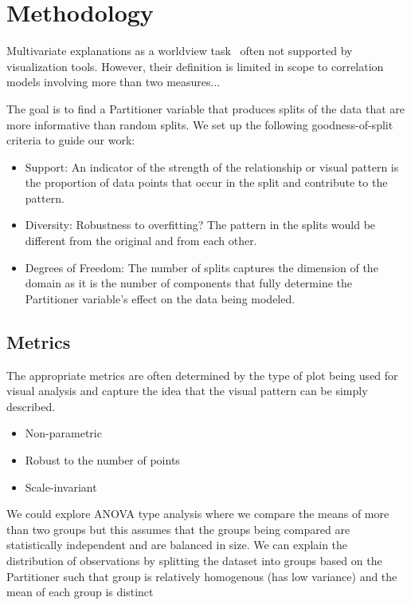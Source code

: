 \section{Methodology}

Multivariate explanations as a worldview task~\cite{Amar2004} often not supported by visualization tools. However, their definition is limited in scope to correlation models involving more than two measures...

The goal is to find a Partitioner variable that produces splits of the data that are more informative than random splits. We set up the following goodness-of-split criteria to guide our work:
\begin{itemize}
\item Support: An indicator of the strength of the relationship or visual pattern is the proportion of data points that occur in the split and contribute to the pattern.
\item Diversity: Robustness to overfitting? The pattern in the splits would be different from the original and from each other. 
\item Degrees of Freedom: The number of splits captures the dimension of the domain as it is the number of components that fully determine the Partitioner variable's effect on the data being modeled.
\end{itemize}

\subsection{Metrics}
The appropriate metrics are often determined by the type of plot being used for visual analysis and capture the idea that the visual pattern can be simply described.

\begin{itemize}
\item Non-parametric
\item Robust to the number of points
\item Scale-invariant
\end{itemize}

We could explore ANOVA type analysis where we compare the means of more than two groups but this assumes that the groups being compared are statistically independent and are balanced in size. We can explain the distribution of observations by splitting the dataset into groups based on the Partitioner such that group is relatively homogenous (has low variance) and the mean of each group is distinct

